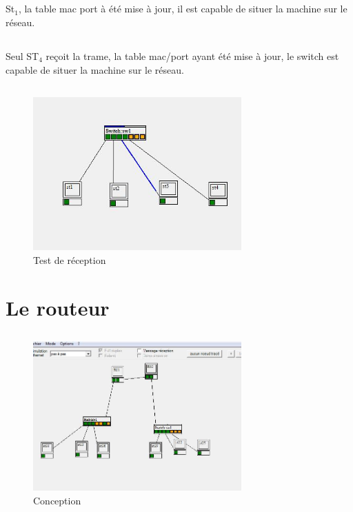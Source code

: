 \documentclass[a4paper, 11pt]{article}
\begin{document}
	\subsection{}
	St$_1$, la table mac port à été mise à jour, il est capable de situer la machine sur le réseau.
	\subsection{}
	Seul ST$_4$ reçoit la trame, la table mac/port ayant été mise à jour, le switch est capable de situer la machine sur le
	réseau.
	\subsection{}
		\begin{figure}[H]
			\centering
			\includegraphics[width=8cm]{3.jpg}
			\caption{Test de réception}
		\end{figure}

	\section{Le routeur}
	\subsection{}
		\begin{figure}[H]
			\centering
			\includegraphics[width=8cm]{4.jpg}
			\caption{Conception}
		\end{figure}
\end{document}
